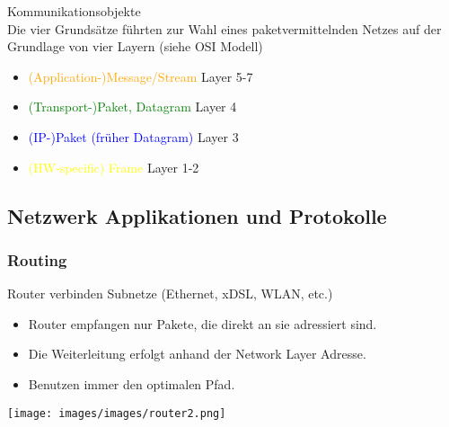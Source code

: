 \begin{definition}{Kommunikationsobjekte}\\
    Die vier Grundsätze führten zur Wahl eines paketvermittelnden Netzes auf der Grundlage von vier Layern (siehe OSI Modell)

    \begin{itemize}
        \item \textcolor{orange}{(Application-)Message/Stream} Layer 5-7
        \item \textcolor{green}{(Transport-)Paket, Datagram} Layer 4
        \item \textcolor{blue}{(IP-)Paket (früher Datagram)} Layer 3
        \item \textcolor{yellow}{(HW-specific) Frame} Layer 1-2
    \end{itemize}
\end{definition}



\subsection{Netzwerk Applikationen und Protokolle}

\subsubsection{Routing}

\begin{definition}{Router} verbinden Subnetze (Ethernet, xDSL, WLAN, etc.)
    \begin{itemize}
        \item Router empfangen nur Pakete, die direkt an sie adressiert sind.
        \item Die Weiterleitung erfolgt anhand der Network Layer Adresse.
        \item Benutzen immer den optimalen Pfad.
    \end{itemize}
    \texttt{[image: images/images/router2.png]}
\end{definition}
    

